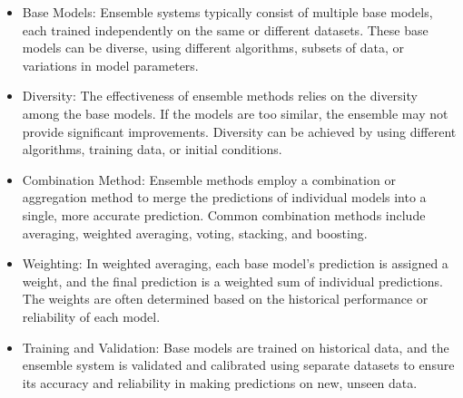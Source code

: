 \documentclass[../paper.tex]{subfiles}
\begin{document}
\begin{itemize}
    \item Base Models: Ensemble systems typically consist of multiple base models, each trained independently on the same or different datasets.
    These base models can be diverse, using different algorithms, subsets of data, or variations in model parameters.

    \item Diversity: The effectiveness of ensemble methods relies on the diversity among the base models.
    If the models are too similar, the ensemble may not provide significant improvements.
    Diversity can be achieved by using different algorithms, training data, or initial conditions.

    \item Combination Method: Ensemble methods employ a combination or aggregation method to merge the predictions of individual models into a single, more accurate prediction.
    Common combination methods include averaging, weighted averaging, voting, stacking, and boosting.

    \item Weighting: In weighted averaging, each base model's prediction is assigned a weight, and the final prediction is a weighted sum of individual predictions.
    The weights are often determined based on the historical performance or reliability of each model.

    \item Training and Validation: Base models are trained on historical data, and the ensemble system is validated and calibrated using separate datasets to ensure its accuracy and reliability in making predictions on new, unseen data.
\end{itemize}
\end{document}
